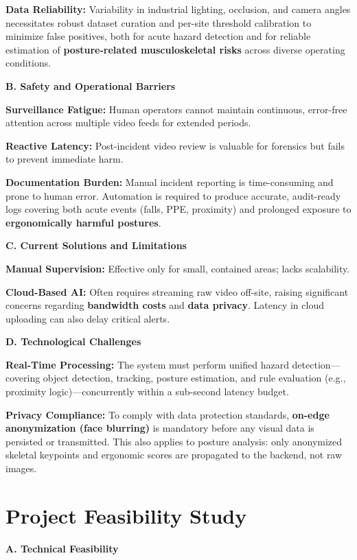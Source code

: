 \textbf{Data Reliability:} Variability in industrial lighting, occlusion, and camera angles necessitates robust dataset curation and per-site threshold calibration to minimize false positives, both for acute hazard detection and for reliable estimation of \textbf{posture-related musculoskeletal risks} across diverse operating conditions.

\textbf{B. Safety and Operational Barriers}

\textbf{Surveillance Fatigue:} Human operators cannot maintain continuous, error-free attention across multiple video feeds for extended periods.

\textbf{Reactive Latency:} Post-incident video review is valuable for forensics but fails to prevent immediate harm.

\textbf{Documentation Burden:} Manual incident reporting is time-consuming and prone to human error. Automation is required to produce accurate, audit-ready logs covering both acute events (falls, PPE, proximity) and prolonged exposure to \textbf{ergonomically harmful postures}.

\textbf{C. Current Solutions and Limitations}

\textbf{Manual Supervision:} Effective only for small, contained areas; lacks scalability.

\textbf{Cloud-Based AI:} Often requires streaming raw video off-site, raising significant concerns regarding \textbf{bandwidth costs} and \textbf{data privacy}. Latency in cloud uploading can also delay critical alerts.

\textbf{D. Technological Challenges}

\textbf{Real-Time Processing:} The system must perform unified hazard detection—covering object detection, tracking, posture estimation, and rule evaluation (e.g., proximity logic)—concurrently within a sub-second latency budget.

\textbf{Privacy Compliance:} To comply with data protection standards, \textbf{on-edge anonymization (face blurring)} is mandatory before any visual data is persisted or transmitted. This also applies to posture analysis: only anonymized skeletal keypoints and ergonomic scores are propagated to the backend, not raw images.

\section{Project Feasibility Study}

\textbf{A. Technical Feasibility}

